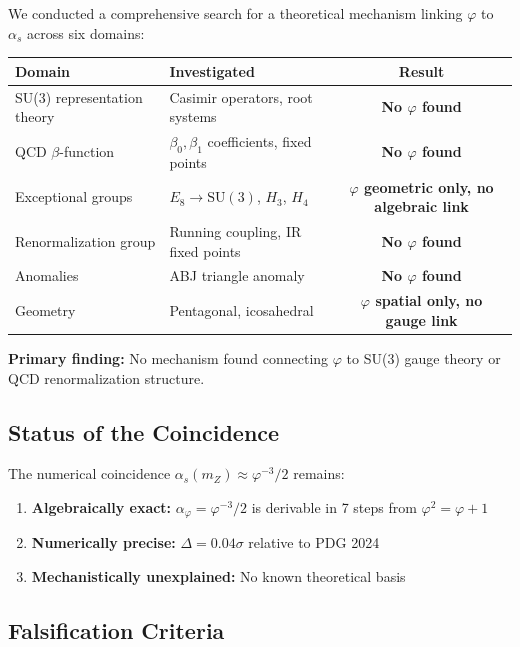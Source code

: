 \documentclass{article}
\begin{document}
We conducted a comprehensive search for a theoretical mechanism linking $\varphi$ to $\alpha_s$ across six domains:

\begin{table}[h]
\centering
\begin{tabular}{llc}
\toprule
Domain & Investigated & Result \\
\midrule
SU(3) representation theory & Casimir operators, root systems & \textbf{No $\varphi$ found} \\
QCD $\beta$-function & $\beta_0, \beta_1$ coefficients, fixed points & \textbf{No $\varphi$ found} \\
Exceptional groups & $E_8 \to \mathrm{SU}(3)$, $H_3$, $H_4$ & \textbf{$\varphi$ geometric only, no algebraic link} \\
Renormalization group & Running coupling, IR fixed points & \textbf{No $\varphi$ found} \\
Anomalies & ABJ triangle anomaly & \textbf{No $\varphi$ found} \\
Geometry & Pentagonal, icosahedral & \textbf{$\varphi$ spatial only, no gauge link} \\
\bottomrule
\end{tabular}
\end{table}

\textbf{Primary finding:} No mechanism found connecting $\varphi$ to SU(3) gauge theory or QCD renormalization structure.

\subsection{Status of the Coincidence}

The numerical coincidence $\alpha_s(m_Z) \approx \varphi^{-3}/2$ remains:

\begin{enumerate}
\item \textbf{Algebraically exact:} $\alpha_\varphi = \varphi^{-3}/2$ is derivable in 7 steps from $\varphi^2 = \varphi + 1$
\item \textbf{Numerically precise:} $\Delta = 0.04\sigma$ relative to PDG 2024
\item \textbf{Mechanistically unexplained:} No known theoretical basis
\end{enumerate}

\subsection{Falsification Criteria}
\end{document}
